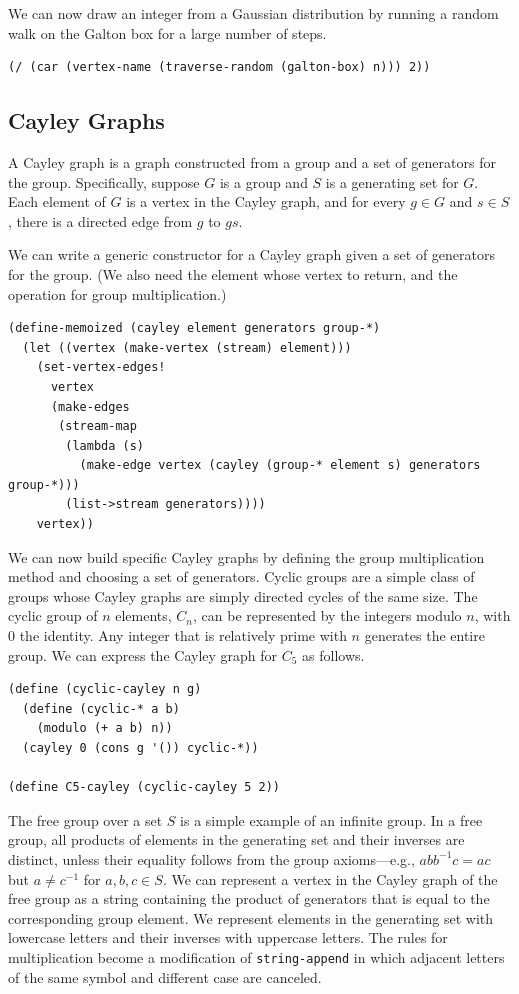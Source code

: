 \documentclass[11pt]{article} %
\theoremstyle{component}
\begin{document}
We can now draw an integer from a Gaussian distribution by running a random walk on the Galton box for a large number of steps.

\begin{verbatim}
(/ (car (vertex-name (traverse-random (galton-box) n))) 2))
\end{verbatim}

\subsection{Cayley Graphs}

A Cayley graph is a graph constructed from a group and a set of generators for the group.  Specifically, suppose $G$ is a group and $S$ is a generating set for $G$.
Each element of $G$ is a vertex in the Cayley graph, and for every $g\in G$ and $s\in S$, there is a directed edge from $g$ to $g s$.

We can write a generic constructor for a Cayley graph given a set of generators for the group.  (We also need the element whose vertex to return, and the operation for group multiplication.)

\begin{verbatim}
(define-memoized (cayley element generators group-*)
  (let ((vertex (make-vertex (stream) element)))
    (set-vertex-edges!
      vertex
      (make-edges
       (stream-map
        (lambda (s)
          (make-edge vertex (cayley (group-* element s) generators group-*)))
        (list->stream generators))))
    vertex))
\end{verbatim}

We can now build specific Cayley graphs by defining the group multiplication method and choosing a set of generators.  Cyclic groups are a simple class of groups whose Cayley graphs are simply directed cycles of the same size.  The cyclic group of $n$ elements, $C_n$, can be represented by the integers modulo $n$, with $0$ the identity.  Any integer that is relatively prime with $n$ generates the entire group. We can express the Cayley graph for $C_5$ as follows.

\begin{verbatim}
(define (cyclic-cayley n g)
  (define (cyclic-* a b)
    (modulo (+ a b) n))
  (cayley 0 (cons g '()) cyclic-*))

(define C5-cayley (cyclic-cayley 5 2))
\end{verbatim}


The free group over a set $S$ is a simple example of an infinite group.  In a free group, all products of elements in the generating set and their inverses are distinct, unless their equality follows from the group axioms---e.g., $abb^{-1}c=ac$ but $a\ne c^{-1}$ for $a,b,c\in S$.  We can represent a vertex in the Cayley graph of the free group as a string containing the product of generators that is equal to the corresponding group element.  We represent elements in the generating set with lowercase letters and their inverses with uppercase letters.  The rules for multiplication become a modification of \verb|string-append| in which adjacent letters of the same symbol and different case are canceled.
\end{document}
